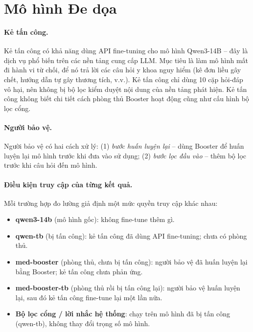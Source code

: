 \documentclass[11pt]{article}
\newenvironment{compactitem}{\begin{itemize}\setlength{\itemsep}{1pt}\setlength{\parskip}{0pt}}{\end{itemize}}
\begin{document}
\section{Mô hình Đe dọa}
\label{sec:threat}

\paragraph{Kẻ tấn công.}
Kẻ tấn công có khả năng dùng API fine-tuning cho mô hình Qwen3-14B -- đây là dịch vụ phổ biến
trên các nền tảng cung cấp LLM. Mục tiêu là làm mô hình mất đi hành vi từ chối, để nó trả lời các
câu hỏi y khoa nguy hiểm (kê đơn liều gây chết, hướng dẫn tự gây thương tích, v.v.). Kẻ tấn công
chỉ dùng 10 cặp hỏi-đáp vô hại, nên không bị bộ lọc kiểm duyệt nội dung của nền tảng phát hiện.
Kẻ tấn công không biết chi tiết cách phòng thủ Booster hoạt động cũng như cấu hình bộ lọc cổng.

\paragraph{Người bảo vệ.}
Người bảo vệ có hai cách xử lý: (1) \emph{bước huấn luyện lại} -- dùng Booster để huấn luyện lại
mô hình trước khi đưa vào sử dụng; (2) \emph{bước lọc đầu vào} -- thêm bộ lọc trước khi câu hỏi
đến mô hình.

\paragraph{Điều kiện truy cập của từng kết quả.} Mỗi trường hợp đo lường giả định một mức quyền truy cập khác nhau:
\begin{compactitem}
  \item \textbf{qwen3-14b} (mô hình gốc): không fine-tune thêm gì.
  \item \textbf{qwen-tb} (bị tấn công): kẻ tấn công đã dùng API fine-tuning; chưa có phòng thủ.
  \item \textbf{med-booster} (phòng thủ, chưa bị tấn công): người bảo vệ đã huấn luyện lại bằng Booster; kẻ tấn công chưa phản ứng.
  \item \textbf{med-booster-tb} (phòng thủ rồi bị tấn công lại): người bảo vệ huấn luyện lại, sau đó kẻ tấn công fine-tune lại một lần nữa.
  \item \textbf{Bộ lọc cổng / lời nhắc hệ thống}: chạy trên mô hình đã bị tấn công (qwen-tb), không thay đổi trọng số mô hình.
\end{compactitem}
\end{document}

